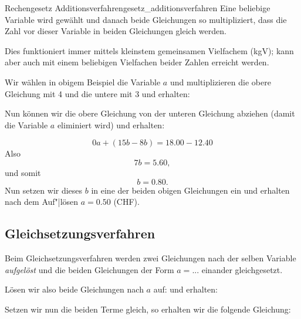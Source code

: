 
  \begin{rezept}{Rechengesetz Additionsverfahren}{gesetz_additionsverfahren}
    Eine beliebige Variable wird gewählt und danach beide Gleichungen so multipliziert,
    dass die Zahl vor dieser Variable in beiden Gleichungen gleich werden.

    Dies funktioniert
    immer mittels kleinstem gemeinsamen Vielfachem (kgV); kann aber auch mit
    einem beliebigen Vielfachen beider Zahlen erreicht werden.
  \end{rezept}

Wir wählen \zB in obigem Beispiel die Variable $a$ und multiplizieren die obere Gleichung mit 4 und die untere mit 3 und
erhalten:


Nun können wir die obere Gleichung von der unteren Gleichung abziehen (damit die Variable $a$ eliminiert wird)
und erhalten:

$$0a  + (15b - 8b)  = 18.00 - 12.40$$
Also
$$7b = 5.60,$$ und somit
$$b = 0.80.$$
Nun setzen wir dieses $b$ in eine der beiden obigen Gleichungen ein und erhalten nach dem Auf"|lösen $a=0.50$ (CHF).
\newpage


\newpage


\subsection{Gleichsetzungsverfahren}\label{lin_gl_gleichsetzungsverfahren}
Beim Gleichsetzungsverfahren werden zwei Gleichungen nach der selben Variable \textit{aufgelöst} und die beiden Gleichungen der Form $a = ...$ einander gleichgesetzt.

Lösen wir also beide Gleichungen nach $a$ auf:
und erhalten:



Setzen wir nun die beiden Terme gleich, so erhalten wir die
folgende Gleichung:


